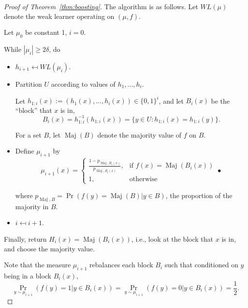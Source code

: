 \begin{proof}[Proof of Theorem~\ref{thm:boosting}]

The algorithm is as follows. Let $WL(\mu)$ denote the weak learner operating on $(\mu, f)$.

Let $\mu_0$ be constant 1, $i=0$.

While $|\mu_i|\ge 2\delta$, do
\begin{itemize}
\item
$h_{i+1}\mapsfrom WL(\mu_i)$.
\item
Partition $U$ according to values of $h_1,\ldots,h_i$.

Let $h_{1:i}(x):= (h_1(x),\ldots, h_i(x))\in \{0,1\}^i$, and let $B_i(x)$ be the ``block'' that $x$ is in, 
$$B_i(x) = h_{1:i}^{-1}(h_{1:i}(x)) = \{y\in U : h_{1:i}(x)=h_{1:i}(y)\}.$$ 

For a set $B$, let $\operatorname{Maj}(B)$ denote the majority value of $f$ on $B$. 
\item
Define $\mu_{i+1}$ by 
%
$$\mu_{i+1}(x) = \begin{cases}
\frac{1-p_{\operatorname{Maj}, B_i(x)}}{p_{\operatorname{Maj}, B_i(x)}},&\text{if } f(x)=\operatorname{Maj}(B_i(x))\\
1,&\text{otherwise}
\end{cases}• $$

where $p_{\operatorname{Maj},B} = \Pr(f(y) = \operatorname{Maj}(B)| y\in B)$, the proportion of the majority in $B$.

\item
$i\mapsfrom i+1$.
\end{itemize}
Finally, return $H_{i}(x) = \operatorname{Maj}({B_{i}(x)})$, i.e., look at the block that $x$ is in, and choose the majority value.

Note that the measure $\mu_{i+1}$ rebalances %
each block $B_i$ such that conditioned on $y$ being in a block $B_i(x)$, 
$$\Pr_{y\sim \mu_{i+1}}(f(y)=1|y\in B_i(x)) = \Pr_{y \sim \mu_{i+1}}(f(y)=0|y\in B_i(x))=\frac{1}{2}.$$


\end{proof}
